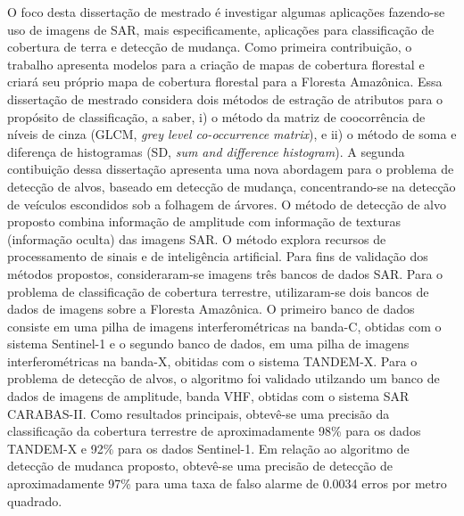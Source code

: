 O foco desta dissertação de mestrado é investigar algumas aplicações fazendo-se uso de imagens de SAR, mais especificamente, aplicações para classificação de cobertura de terra e detecção de mudança.
Como primeira contribuição, o trabalho apresenta modelos para a criação de mapas de cobertura florestal e criará seu próprio mapa de cobertura florestal para a Floresta Amazônica. Essa dissertação de mestrado considera dois métodos de estração de atributos para o propósito de classificação, a saber, i) o método da matriz de coocorrência de níveis de cinza (GLCM, \textit{grey level co-occurrence matrix}), e ii) o método de soma e diferença de histogramas (SD, \textit{sum and difference histogram}).
A segunda contibuição dessa dissertação apresenta uma nova abordagem para o problema de detecção de alvos, baseado em detecção de mudança, concentrando-se na detecção de veículos escondidos sob a folhagem de árvores. O método de detecção de alvo proposto combina informação de amplitude com informação de texturas (informação oculta)  das imagens SAR. O método explora recursos de processamento de sinais e de inteligência artificial.  Para fins de validação dos métodos propostos, consideraram-se imagens três bancos de dados SAR. Para o problema de classificação de cobertura terrestre, utilizaram-se dois bancos de dados de imagens sobre a Floresta Amazônica. O primeiro banco de dados consiste em uma pilha de imagens interferométricas na banda-C, obtidas com o  sistema Sentinel-1 e o segundo banco de dados, em uma pilha de imagens interferométricas na banda-X, obitidas com o sistema TANDEM-X. Para o problema de detecção de alvos, o algoritmo foi validado utilzando um banco de dados de imagens de amplitude, banda VHF, obtidas com o sistema SAR CARABAS-II. Como resultados principais, obtevê-se uma precisão da classificação da cobertura terrestre de aproximadamente 98\% para os dados TANDEM-X e 92\% para os dados Sentinel-1. Em relação ao algoritmo de detecção de mudanca proposto, obtevê-se uma precisão de detecção de aproximadamente 97\% para uma taxa de falso alarme de 0.0034 erros por metro quadrado.